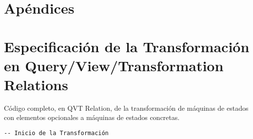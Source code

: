 \chapter*{Apéndices}
\label{Apendices}

\appendix
\chapter{Especificación de la Transformación en Query/View/Transformation Relations}
\label{Especificacion de la Transformacion en QVT/Relations QVT}


Código completo, en QVT Relation, de la transformación de máquinas de estados con elementos opcionales a máquinas de estados concretas.

\begin{verbatim}
-- Inicio de la Transformación 

\end{verbatim}
